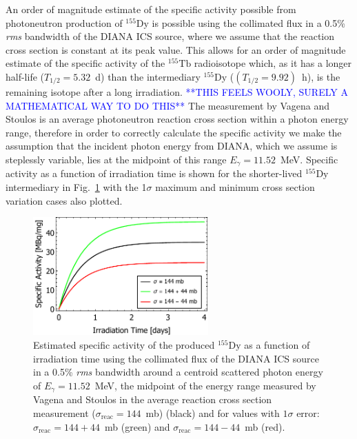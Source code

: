 \documentclass[../main.tex]{subfiles}
\begin{document}
An order of magnitude estimate of the specific activity possible from  photoneutron production of $^{155}\mathrm{Dy}$ is possible using the collimated flux in a 0.5\% \textit{rms}  bandwidth of the DIANA ICS source, where we assume that the reaction cross section is constant at its peak value. This allows for an order of magnitude estimate of the specific activity of the $^{155}\mathrm{Tb}$ radioisotope which, as it has a longer half-life ($T_{1/2} = 5.32$~\si{\day}) than the intermediary $^{155}\mathrm{Dy}$ ($\left(T_{1/2} = 9.92\right)$~\si{\hour}), is the remaining isotope after a long irradiation. \textcolor{blue}{**THIS FEELS WOOLY, SURELY A MATHEMATICAL WAY TO DO THIS**} The measurement by Vagena and Stoulos \cite{vagena2017photodisintegration} is an average photoneutron reaction cross section within a photon energy range, therefore in order to correctly calculate the specific activity we make the assumption that the incident photon energy from DIANA, which we assume is steplessly variable, lies at the midpoint of this range $E_{\gamma} = 11.52$~\si{\mega\electronvolt}. Specific activity as a function of irradiation time is shown for the shorter-lived $^{155}\mathrm{Dy}$ intermediary in Fig.~\ref{fig:155Dy_specific_activity} with the 1$\sigma$ maximum and minimum cross section variation cases also plotted.
\begin{figure}[!h]
\centering
\includegraphics[width=0.6\textwidth]{Figures/DIANA_Inverse_Compton_Source_Design/155Dy_specific_activity.pdf}
\caption{Estimated specific activity of the produced $^{155}\mathrm{Dy}$ as a function of irradiation time using the collimated flux of the DIANA ICS source in a 0.5\% \textit{rms} bandwidth around a centroid scattered photon energy of $E_{\gamma} = 11.52$~\si{\mega\electronvolt}, the midpoint of the energy range measured by Vagena and Stoulos \cite{vagena2017photodisintegration} in the average reaction cross section measurement ($\sigma_{\mathrm{reac}} = 144$~\si{\milli\barn}) (black) and for values with $1\sigma$ error: $\sigma_{\mathrm{reac}} = 144 + 44$~\si{\milli\barn} (green) and $\sigma_{\mathrm{reac}} = 144 - 44$~\si{\milli\barn} (red).} 
\label{fig:155Dy_specific_activity}
\end{figure}
\end{document}
